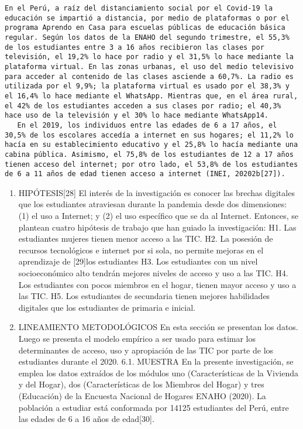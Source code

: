 \begin{verbatim}
En el Perú, a raíz del distanciamiento social por el Covid-19 la educación se impartió a distancia, por medio de plataformas o por el programa Aprendo en Casa para escuelas públicas de educación básica regular. Según los datos de la ENAHO del segundo trimestre, el 55,3% de los estudiantes entre 3 a 16 años recibieron las clases por televisión, el 19,2% lo hace por radio y el 31,5% lo hace mediante la plataforma virtual. En las zonas urbanas, el uso del medio televisivo para acceder al contenido de las clases asciende a 60,7%. La radio es utilizada por el 9,9%; la plataforma virtual es usado por el 38,3% y el 16,4% lo hace mediante el WhatsApp. Mientras que, en el área rural, el 42% de los estudiantes acceden a sus clases por radio; el 40,3% hace uso de la televisión y el 30% lo hace mediante WhatsApp14.
   En el 2019, los individuos entre las edades de 6 a 17 años, el 30,5% de los escolares accedía a internet en sus hogares; el 11,2% lo hacía en su establecimiento educativo y el 25,8% lo hacía mediante una cabina pública. Asimismo, el 75,8% de los estudiantes de 12 a 17 años tienen acceso del internet; por otro lado, el 53,8% de los estudiantes de 6 a 11 años de edad tienen acceso a internet (INEI, 20202b[27]).
\end{verbatim}

\begin{enumerate}
\def\labelenumi{\arabic{enumi}.}
\setcounter{enumi}{4}
\item
  HIPÓTESIS{[}28{]} El interés de la investigación es conocer las
  brechas digitales que los estudiantes atraviesan durante la pandemia
  desde dos dimensiones: (1) el uso a Internet; y (2) el uso específico
  que se da al Internet. Entonces, se plantean cuatro hipótesis de
  trabajo que han guiado la investigación: H1. Las estudiantes mujeres
  tienen menor acceso a las TIC. H2. La posesión de recursos
  tecnológicos e internet por si sola, no permite mejoras en el
  aprendizaje de {[}29{]}los estudiantes H3. Los estudiantes con un
  nivel socioeconómico alto tendrán mejores niveles de acceso y uso a
  las TIC. H4. Los estudiantes con pocos miembros en el hogar, tienen
  mayor acceso y uso a las TIC. H5. Los estudiantes de secundaria tienen
  mejores habilidades digitales que los estudiantes de primaria e
  inicial.
\item
  LINEAMIENTO METODOLÓGICOS En esta sección se presentan los datos.
  Luego se presenta el modelo empírico a ser usado para estimar los
  determinantes de acceso, uso y apropiación de las TIC por parte de los
  estudiantes durante el 2020. 6.1. MUESTRA En la presente
  investigación, se emplea los datos extraídos de los módulos uno
  (Características de la Vivienda y del Hogar), dos (Características de
  los Miembros del Hogar) y tres (Educación) de la Encuesta Nacional de
  Hogares ENAHO (2020). La población a estudiar está conformada por
  14125 estudiantes del Perú, entre las edades de 6 a 16 años de
  edad{[}30{]}.
\end{enumerate}

